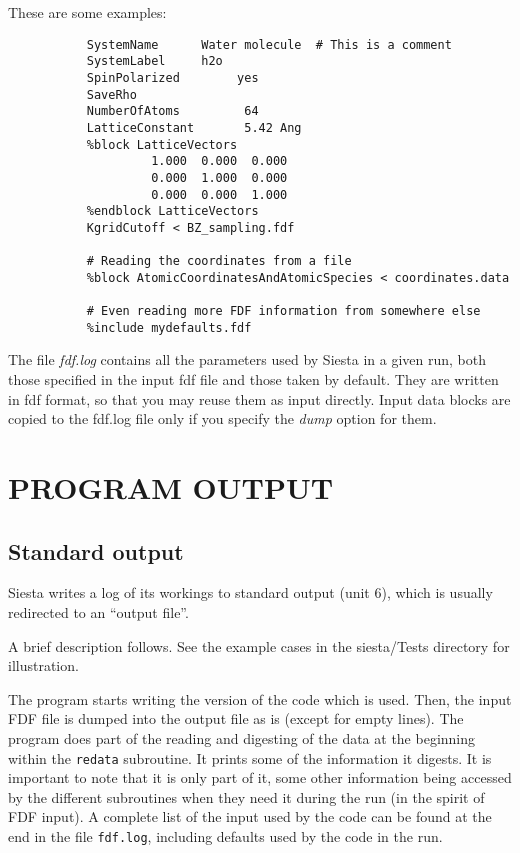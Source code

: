 \documentclass[11pt]{article}
\begin{document}
\noindent
These are some examples:

\begin{verbatim}
           SystemName      Water molecule  # This is a comment
           SystemLabel     h2o
           SpinPolarized        yes
           SaveRho
           NumberOfAtoms         64
           LatticeConstant       5.42 Ang
           %block LatticeVectors
                    1.000  0.000  0.000
                    0.000  1.000  0.000
                    0.000  0.000  1.000
           %endblock LatticeVectors
           KgridCutoff < BZ_sampling.fdf

           # Reading the coordinates from a file
           %block AtomicCoordinatesAndAtomicSpecies < coordinates.data

           # Even reading more FDF information from somewhere else
           %include mydefaults.fdf
\end{verbatim}

The file {\it fdf.log} contains all the parameters used by {\sc Siesta}
in a given run, both those specified in the input fdf file and
those taken by default. They are written in fdf format, so that
you may reuse them as input directly. Input data blocks are
copied to the fdf.log file only if you specify the {\it dump} option
for them.

\section{PROGRAM OUTPUT}

\subsection{Standard output} 

{\sc Siesta} writes a log of its workings to standard output (unit 6),
which is usually redirected to an ``output file''.

A brief description follows. See the example cases in the
siesta/Tests directory for illustration.

The program starts writing the version of the code which is
used. Then, the input FDF file is dumped into the output file as is
(except for empty lines). The program does part of the reading and
digesting of the data at the beginning within the {\tt redata}
subroutine. It prints some of the information it digests. It is
important to note that it is only part of it, some other information
being accessed by the different subroutines when they need it during
the run (in the spirit of FDF input).  A complete list of the input
used by the code can be found at the end in the file {\tt fdf.log},
including defaults used by the code in the run.
\end{document}
